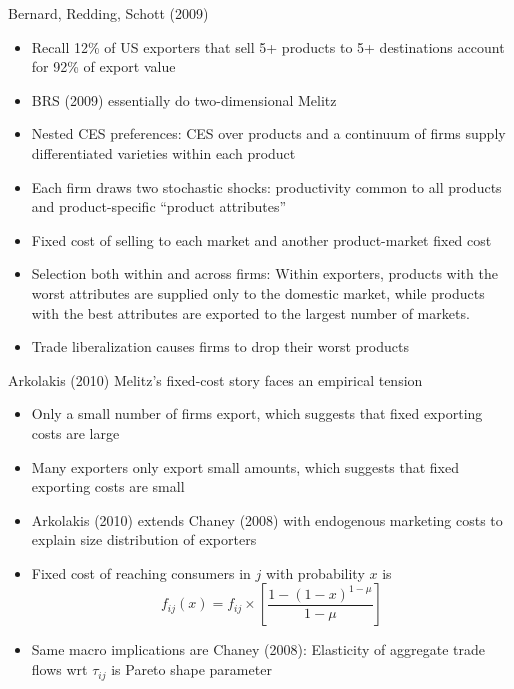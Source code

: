 \documentclass[10pt,notes=hide]{beamer}
\begin{document}
\begin{frame}{Bernard, Redding, Schott (2009)}
\begin{itemize}
	\item Recall 12\% of US exporters that sell 5+ products to 5+ destinations account for 92\% of export value
	\item BRS (2009) essentially do two-dimensional Melitz
	\item Nested CES preferences: CES over products and a continuum of firms supply differentiated varieties within each product
	\item Each firm draws two stochastic shocks: productivity common to all products and product-specific ``product attributes''
	\item Fixed cost of selling to each market and another product-market fixed cost
	\item Selection both within and across firms: Within exporters, products with the worst attributes are supplied only to the domestic market, while products with the best attributes are exported to the largest number of markets.
	\item Trade liberalization causes firms to drop their worst products
\end{itemize}
\end{frame}
\begin{frame}{Arkolakis (2010)}
Melitz's fixed-cost story faces an empirical tension
\begin{itemize}
	\item Only a small number of firms export, which suggests that fixed exporting costs are large
	\item Many exporters only export small amounts, which suggests that fixed exporting costs are small
	\item Arkolakis (2010) extends Chaney (2008) with endogenous marketing costs to explain size distribution of exporters
	\item Fixed cost of reaching consumers in $j$ with probability $x$ is
	$$
	f_{ij}(x) = f_{ij} \times \left[\frac{1-(1-x)^{1-\mu}}{1-\mu}\right]
	$$
	\item Same macro implications are Chaney (2008): Elasticity of aggregate trade flows wrt $\tau_{ij}$ is Pareto shape parameter
\end{itemize}
\end{frame}
\end{document}
